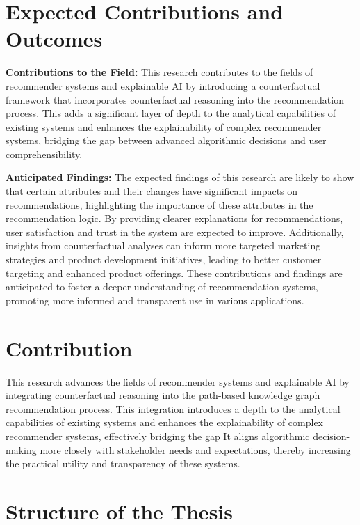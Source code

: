 \section{Expected Contributions and Outcomes}

\textbf{Contributions to the Field:} This research contributes to the fields of
recommender systems and explainable AI by introducing a counterfactual framework
that incorporates counterfactual reasoning into the recommendation process. This
adds a significant layer of depth to the analytical capabilities of existing systems
and enhances the explainability of complex recommender systems, bridging the gap
between advanced algorithmic decisions and user comprehensibility.


\textbf{Anticipated Findings:} The expected findings of this research are likely to show that
certain attributes and their changes have significant impacts on recommendations,
highlighting the importance of these attributes in the recommendation logic. By providing
clearer explanations for recommendations, user satisfaction and trust in the
system are expected to improve. Additionally, insights from counterfactual
analyses can inform more targeted marketing strategies and product development
initiatives, leading to better customer targeting and enhanced product offerings.
These contributions and findings are anticipated to foster a deeper
understanding of recommendation systems, promoting more informed and transparent
use in various applications.

\section{Contribution}

This research advances the fields of recommender systems and explainable AI by
integrating counterfactual reasoning into the path-based knowledge graph
recommendation process. This integration introduces a depth to the analytical capabilities
of existing systems and enhances the explainability of complex recommender systems,
effectively bridging the gap It aligns algorithmic decision-making more closely
with stakeholder needs and expectations, thereby increasing the practical utility
and transparency of these systems.

\section{Structure of the Thesis}


